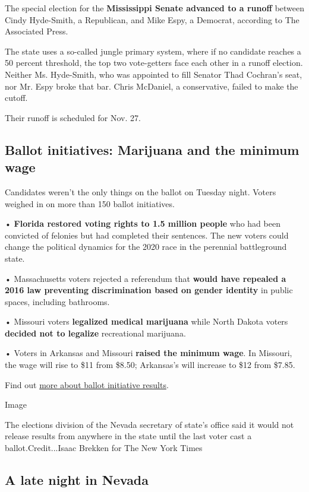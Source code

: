 The special election for the \textbf{Mississippi Senate advanced to a
runoff} between Cindy Hyde-Smith, a Republican, and Mike Espy, a
Democrat, according to The Associated Press.

The state uses a so-called jungle primary system, where if no candidate
reaches a 50 percent threshold, the top two vote-getters face each other
in a runoff election. Neither Ms. Hyde-Smith, who was appointed to fill
Senator Thad Cochran's seat, nor Mr. Espy broke that bar. Chris
McDaniel, a conservative, failed to make the cutoff.

Their runoff is scheduled for Nov. 27.

\hypertarget{ballot-initiatives-marijuana-and-the-minimum-wage}{%
\subsection{Ballot initiatives: Marijuana and the minimum
wage}\label{ballot-initiatives-marijuana-and-the-minimum-wage}}

Candidates weren't the only things on the ballot on Tuesday night.
Voters weighed in on more than 150 ballot initiatives.

• \textbf{Florida restored voting rights to 1.5 million people} who had
been convicted of felonies but had completed their sentences. The new
voters could change the political dynamics for the 2020 race in the
perennial battleground state.

• Massachusetts voters rejected a referendum that \textbf{would have
repealed a 2016 law preventing discrimination based on gender identity}
in public spaces, including bathrooms.

• Missouri voters \textbf{legalized medical marijuana} while North
Dakota voters \textbf{decided not to legalize} recreational marijuana.

• Voters in Arkansas and Missouri \textbf{raised the minimum wage}. In
Missouri, the wage will rise to \$11 from \$8.50; Arkansas's will
increase to \$12 from \$7.85.

Find out
\href{https://www.nytimes.com/2018/11/06/us/politics/ballot-initiatives-referendum.html}{more
about ballot initiative results}.

Image

The elections division of the Nevada secretary of state's office said it
would not release results from anywhere in the state until the last
voter cast a ballot.Credit...Isaac Brekken for The New York Times

\hypertarget{a-late-night-in-nevada}{%
\subsection{A late night in Nevada}\label{a-late-night-in-nevada}}

